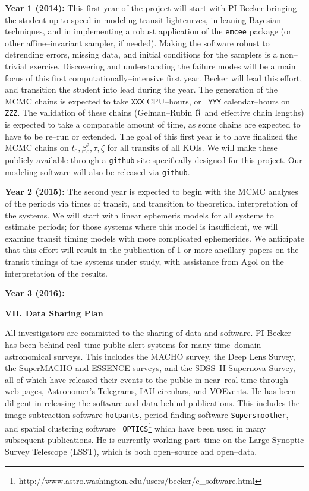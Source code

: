 {\bf Year 1 (2014):} This first year of the project will start with PI
Becker bringing the student up to speed in modeling transit
lightcurves, in leaning Bayesian techniques, and in implementing a
robust application of the {\tt emcee} package (or other
affine--invariant sampler, if needed).  Making the software robust to
detrending errors, missing data, and initial conditions for the
samplers is a non--trivial exercise.  Discovering and understanding
the failure modes will be a main focus of this first
computationally--intensive first year.  Becker will lead this effort,
and transition the student into lead during the year.  The generation
of the MCMC chains is expected to take {\tt XXX} CPU--hours, or {\tt
  YYY} calendar--hours on {\tt ZZZ}. The validation of these chains
(Gelman--Rubin $\hat{\rm R}$ and effective chain lengths) is expected
to take a comparable amount of time, as some chains are expected to
have to be re--run or extended.  The goal of this first year is to
have finalized the MCMC chains on $t_0, \beta_0^2, \tau, \zeta$ for
all transits of all KOIs.  We will make these publicly available
through a {\tt github} site specifically designed for this project.
Our modeling software will also be released via {\tt github}.

{\bf Year 2 (2015):} The second year is expected to begin with the
MCMC analyses of the periods via times of transit, and transition to
theoretical interpretation of the systems.  We will start with linear
ephemeris models for all systems to estimate periods; for those
systems where this model is insufficient, we will examine transit
timing models with more complicated ephemerides.  We anticipate that
this effort will result in the publication of 1 or more ancillary
papers on the transit timings of the systems under study, with
assistance from Agol on the interpretation of the results.

{\bf Year 3 (2016):} 

\bigskip
\centerline{\bf VII. Data Sharing Plan}
\smallskip

All investigators are committed to the sharing of data and software.
PI Becker has been behind real--time public alert systems for many
time--domain astronomical surveys.  This includes the MACHO survey,
the Deep Lens Survey, the SuperMACHO and ESSENCE surveys, and the
SDSS--II Supernova Survey, all of which have released their events to
the public in near--real time through web pages, Astronomer's
Telegrams, IAU circulars, and VOEvents.  He has been diligent in
releasing the software and data behind publications.  This includes
the image subtraction software {\tt hotpants}, period finding software
{\tt Supersmoother}, and spatial clustering software {\tt
  OPTICS}\footnote{http://www.astro.washington.edu/users/becker/c\_software.html}
which have been used in many subsequent publications.  He is currently
working part--time on the Large Synoptic Survey Telescope (LSST),
which is both open--source and open--data.


